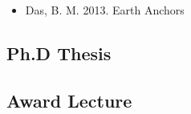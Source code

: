 \documentclass[a4paper, nobind]{templates/ociamthesis}
\providecommand{\tightlist}{%
  \setlength{\itemsep}{0pt}\setlength{\parskip}{0pt}}
\newcommand*{\bibtitle}{Works Cited}
\begin{document}
\begin{itemize}
\tightlist
\item
  Das, B. M. 2013. Earth Anchors
\end{itemize}

\hypertarget{ph.d-thesis}{%
\subsection{Ph.D Thesis}\label{ph.d-thesis}}

\hypertarget{award-lecture}{%
\subsection{Award Lecture}\label{award-lecture}}


\setlength{\baselineskip}{0pt} %

{\renewcommand*\MakeUppercase[1]{#1}%
\printbibliography[heading=bibintoc,title={\bibtitle}]}
\end{document}
